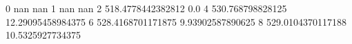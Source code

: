 0 nan nan
1 nan nan
2 518.4778442382812 0.0
4 530.768798828125 12.29095458984375
6 528.4168701171875 9.93902587890625
8 529.0104370117188 10.5325927734375

